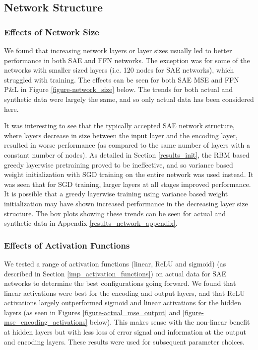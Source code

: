 \documentclass[a4paper,11pt,oneside]{article}
\theoremstyle{plain}
\theoremstyle{definition}
\begin{document}
	\newpage

	\subsection{Network Structure}\label{results_network}
	
	\subsubsection{Effects of Network Size}
	
	We found that increasing network layers or layer sizes usually led to better performance in both SAE and FFN networks. The exception was for some of the networks with smaller sized layers (i.e. 120 nodes for SAE networks), which struggled with training. The effects can be seen for both SAE MSE and FFN P\&L in Figure \ref{figure-network_size} below. The trends for both actual and synthetic data were largely the same, and so only actual data has been considered here. \newline
	
	It was interesting to see that the typically accepted SAE network structure, where layers decrease in size between the input layer and the encoding layer, resulted in worse performance (as compared to the same number of layers with a constant number of nodes). As detailed in Section \ref{results_init}, the RBM based greedy layerwise pretraining proved to be ineffective, and so variance based weight initialization with SGD training on the entire network was used instead. It was seen that for SGD training, larger layers at all stages improved performance. It is possible that a greedy layerwise training using variance based weight initialization may have shown increased performance in the decreasing layer size structure. The box plots showing these trends can be seen for actual and synthetic data in Appendix \ref{results_network_appendix}.
	
	\subsubsection{Effects of Activation Functions}\label{results_activations_scaling}
	
	We tested a range of activation functions (linear, ReLU and sigmoid) (as described in Section \ref{imp_activation_functions}) on actual data for SAE networks to determine the best configurations going forward. We found that linear activations were best for the encoding and output layers, and that ReLU activations largely outperformed sigmoid and linear activations for the hidden layers (as seen in Figures \ref{figure-actual_mse_output} and \ref{figure-mse_encoding_activations} below). This makes sense with the non-linear benefit at hidden layers but with less loss of error signal and information at the output and encoding layers. These results were used for subsequent parameter choices.
	
\end{document}
